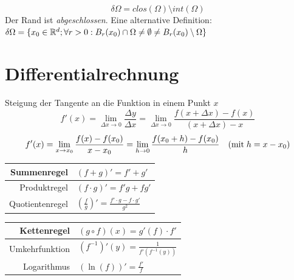 \documentclass[a4paper]{article}
\begin{document}
		\begin{fdef}
			$$\delta \Omega = clos(\Omega) \setminus int(\Omega)$$
			Der Rand ist \emph{abgeschlossen}. Eine alternative Definition: $\delta \Omega = \{x_0 \in \mathbb{R}^d; \forall r >0: B_r(x_0) \cap \Omega \neq \emptyset \neq  B_r(x_0) \setminus \Omega \}$
		\end{fdef}

\newpage
\section{Differentialrechnung}

	\begin{fdef}
		Steigung der Tangente an die Funktion in einem Punkt $x$\\[-3mm]
		$$f'(x) = \lim \limits_{\Delta x \to 0} \frac{\Delta y}{\Delta x} = \lim \limits_{\Delta x \to 0} \frac{f(x + \Delta x) - f(x)}{(x + \Delta x) - x}$$
		$$f'(x) = \lim \limits_{x \to x_0} \frac{f(x) - f(x_0)}{x - x_0} = \lim \limits_{h \to 0} \frac{f(x_0 + h)- f(x_0)}{h} \quad (\text{mit} \thickspace  h = x - x_0)$$
	\end{fdef}

	\begin{fregeln}
			\vspace{-4.5mm}
		\begin{multicols}{2}
		\renewcommand{\arraystretch}{1.6}
		\begin{tabular}{r|l}
				Summenregel        &           $(f + g)' = f' + g'$\\\hline
				Produktregel       &           $(f \cdot g)' = f'g + fg'$\\[1.4mm]\hline
				Quotientenregel    &           $\left(\frac{f}{g} \right)' = \frac{f' \cdot g - f \cdot g'}{g^2}$\\
		\end{tabular}
		\begin{tabular}{r|l}
				Kettenregel        &           $(g \circ f)(x) = g'(f) \cdot f'$\\\hline
				Umkehrfunktion     &           $(f^{-1})'(y) = \frac{1}{f'(f^{-1}(y))}$\\[1.4mm]\hline
				Logarithmus       &        $(\ln(f))' = \frac{f'}{f}$
		\end{tabular}
		\end{multicols}
			\vspace{-3mm}
	\end{fregeln}
\end{document}
